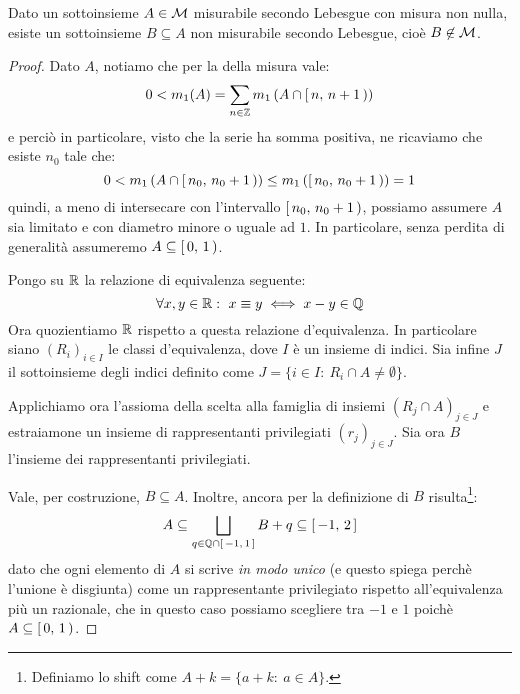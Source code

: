 \begin{theorem}\label{InsiemeVitali}
	Dato un sottoinsieme $A\in\mathcal M$ misurabile secondo Lebesgue con misura non nulla, esiste un sottoinsieme $B\subseteq A$ non misurabile secondo Lebesgue, cioè $B\not\in\mathcal M$.
\end{theorem}
\begin{proof}
	Dato $A$, notiamo che per la \sigadd[ità] della misura vale:
	\begin{equation*}
		0<m_1(A)=\sum_{n\in\mathbb Z} m_1\left(A\cap[\,n,\,n+1\,)\right)
	\end{equation*}
	e perciò in particolare, visto che la serie ha somma positiva, ne ricaviamo che esiste $n_0$ tale che:
	\begin{equation*}
		0<m_1\left(A\cap[\,n_0,\,n_0+1\,)\right)\le m_1\left([\,n_0,\,n_0+1\,)\right)=1
	\end{equation*}
	quindi, a meno di intersecare con l'intervallo $[\,n_0,\,n_0+1\,)$, possiamo assumere $A$ sia limitato e con diametro minore o uguale ad $1$. In particolare, senza perdita di generalità assumeremo $A\subseteq [\,0,\,1\,)$.
	
	Pongo su $\mathbb R$ la relazione di equivalenza seguente:
	\begin{equation*}
		\forall x,y\in\R:\ x\equiv y\iff x-y\in\mathbb Q
	\end{equation*}
	Ora quozientiamo $\mathbb R$ rispetto a questa relazione d'equivalenza. In particolare siano $(R_i)_{i\in I}$ le classi d'equivalenza, dove $I$ è un insieme di indici. Sia infine $J$ il sottoinsieme degli indici definito come $J=\{i\in I:\ R_i\cap A\not =\emptyset\}$. 

	Applichiamo ora l'assioma della scelta alla famiglia di insiemi $(R_j\cap A)_{j\in J}$ e estraiamone un insieme di rappresentanti privilegiati $(r_j)_{j\in J}$. Sia ora $B$ l'insieme dei rappresentanti privilegiati.
	
	Vale, per costruzione, $B\subseteq A$. 
	Inoltre, ancora per la definizione di $B$ risulta\footnote{Definiamo lo shift come $A+k=\{a+k:\ a\in A\}$.}:
	\begin{equation}\label{ContenimentiVitali}
		A\subseteq\bigsqcup_{q\in\mathbb Q\cap[\,-1,\,1\,]} B+q\subseteq [\,-1,\,2\,]
	\end{equation}
	dato che ogni elemento di $A$ si scrive \emph{in modo unico} (e questo spiega perchè l'unione è disgiunta) come un rappresentante privilegiato rispetto all'equivalenza più un razionale, che in questo caso possiamo scegliere tra $-1$ e $1$ poichè $A\subseteq [\,0,\,1\,)$.
	

\end{proof}
